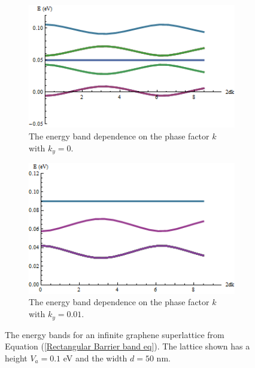 			\begin{figure}
				\begin{subfigure}{0.5\textwidth}
					\centerline{\includegraphics[scale=0.6]{images/superlattice-bands-k}}
					\caption{The energy band dependence on the phase factor $k$ with $k_{y}=0$.}
				\end{subfigure}
				\hspace{0.6cm}
				\begin{subfigure}{0.5\textwidth}
					\centerline{\includegraphics[scale=0.6]{images/superlattice-bands}}
					\caption{The energy band dependence on the phase factor $k$ with $k_{y}=0.01$.}
				\end{subfigure}
				\caption{The energy bands for an infinite graphene superlattice from Equation (\ref{Rectangular Barrier band eq}). The lattice shown has a height $V_{a}=0.1$ eV and the width $d=50$ nm.}
				\label{superlattice-bands}
			\end{figure}
%